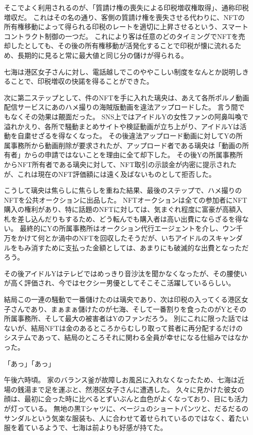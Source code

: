 そこでよく利用されるのが、「質請け権の喪失による印税増収権取得」、通称印税増収だ。
これはその名の通り、客側の質請け権を喪失させる代わりに、NFTの所有権移動によって得られる印税のレートを適切に上昇させるという、スマートコントラクト制御の一つだ。
これにより客は任意のどのタイミングでNFTを売却したとしても、その後の所有権移動が活発化することで印税が懐に流れるため、長期的に見ると常に最大値と同じ分の儲けが得られる。

七海は港区女子さんに対し、電話越しでこのややこしい制度をなんとか説明しきることで、印税増収の快諾を得ることができた。

次に第二ステップとして、件のNFTを手に入れた璃央は、あえて各所ポルノ動画配信サービスにあのハメ撮りの海賊版動画を違法アップロードした。
言う間でもなくその効果は覿面だった。
SNS上ではアイドルYの女性ファンの阿鼻叫喚で溢れかえり、各所で騒動まとめサイトや検証動画が立ち上がり、アイドルYは活動を自粛せざるを得なくなった。
その後違法アップロード動画に対してYの所属事務所から動画削除が要求されたが、アップロード者である璃央は「動画の所有者」からの申請ではないことを理由に全て却下した。
その後Yの所属事務所からNFT所有者である璃央に対して、NFT取引の示談金が内密に提示されたが、これは現在のNFT評価額には遠く及ばないものとして拒否した。

こうして璃央は焦らしに焦らしを重ねた結果、最後のステップで、ハメ撮りのNFTを公共オークションに出品した。
NFTオークションは全ての参加者にNFT購入の権利があり、特に話題のNFTに対しては、気まぐれ程度に富豪が高額入札を差し込んだりもするため、どう転んでも購入者は高い出費にならざるを得ない。
最終的にYの所属事務所はオークション代行エージェントを介し、ウン千万をかけて何とか渦中のNFTを回収したそうだが、いちアイドルのスキャンダルをもみ消すために支払った金額としては、あまりにも破滅的な出費となっただろう。

その後アイドルYはテレビではめっきり音沙汰を聞かなくなったが、その腰使いが高く評価され、今ではセクシー男優としてそこそこ活躍しているらしい。

結局この一連の騒動で一番儲けたのは璃央であり、次は印税の入ってくる港区女子さんであり、まぁまぁ儲けたのが七海、そして一番割りを食ったのがYとその所属事務所、そして最大の被害者はYのファンだろう。
別にこれに限った話ではないが、結局NFTは金のあるところからむしり取って貧者に再分配するだけのシステムであって、結局のところそれに関わる全員が幸せになる仕組みではなかった。

\sectionbreak

「あっ」「あっ」

午後六時頃。
家のバランス釜が故障しお風呂に入れなくなったため、七海は近場の銭湯まで足を運ぶと、然港区女子さんに遭遇した。
久々に見かけた彼女の顔は、最初に会った時に比べるとずいぶんと血色がよくなっており、目にも活力が灯っている。
無地の黒Tシャツに、ベージュのショートパンツと、だるだるのサンダルという気楽な服装も、人に合わせて着せられているのではなく、着たい服を着ているようで、七海は前よりも好感が持てた。

